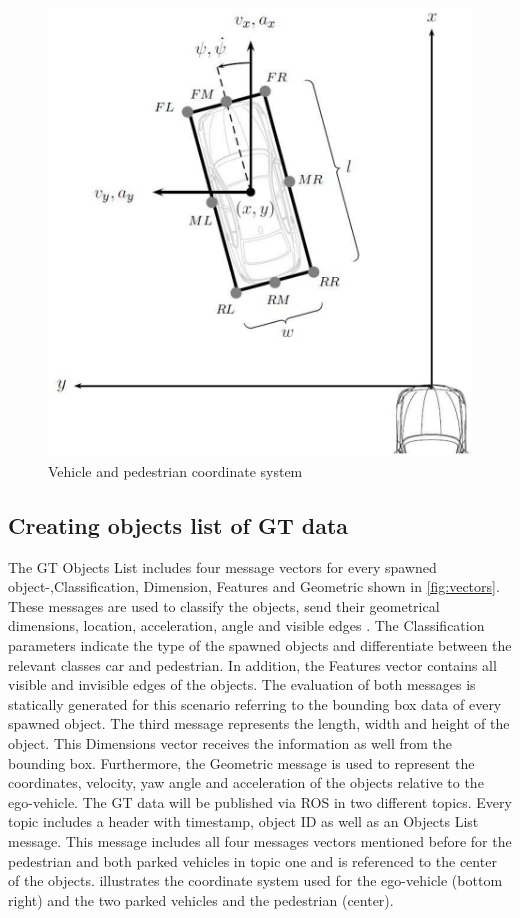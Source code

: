 \begin{figure}[b]
	\centering
	\includegraphics[scale=0.4]{images/KoordinatenSystem}
	\caption{Vehicle and pedestrian coordinate system \cite{Aeberhard}}
	\label{fig:coordinate}
\end{figure}
\subsection{Creating objects list of \ac{GT} data}\label{B}
The \ac{GT} Objects List includes four message vectors for every spawned object-,Classification, Dimension, Features and Geometric shown in \cref{fig:vectors}. These messages are used to classify the objects, send their geometrical dimensions, location, acceleration, angle and visible edges \cite{Aeberhard}.
The Classification parameters indicate the type of the spawned objects and differentiate between the relevant classes car and pedestrian. In addition, the Features vector contains all visible and invisible edges of the objects. The evaluation of both messages is statically generated for this scenario referring to the bounding box data of every spawned object. The third message represents the length, width and height of the object. This Dimensions vector receives the information as well from the bounding box. Furthermore, the Geometric message is used to represent the coordinates, velocity, yaw angle and acceleration of the objects relative to the ego-vehicle. 
The \ac{GT} data will be published via \ac{ROS} in two different topics. Every topic includes a header with timestamp, object \ac{ID} as well as an Objects List message. This message includes all four messages vectors mentioned before for the pedestrian and both parked vehicles in topic one and is referenced to the center of the objects.  illustrates the coordinate system used for the ego-vehicle (bottom right) and the two parked vehicles and the pedestrian (center). 

